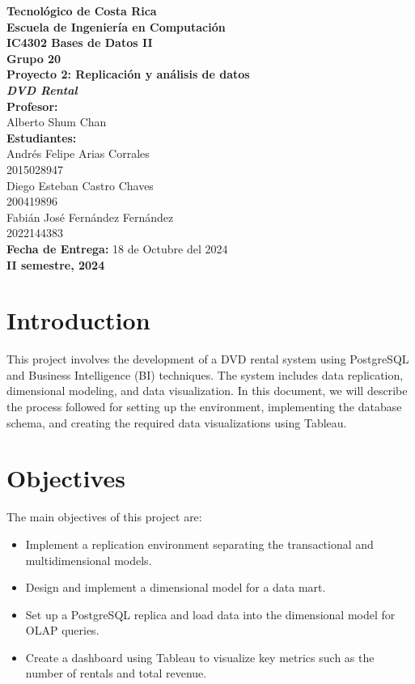 \documentclass[a4paper, 12pt]{article}
\begin{document}
\begin{titlepage}
    \centering
    {\Large\textbf{Tecnológico de Costa Rica}}\\[0.5cm]
    {\Large\textbf{Escuela de Ingeniería en Computación}}\\[0.5cm]
    {\Large\textbf{IC4302 Bases de Datos II}}\\[0.5cm]
    {\Large\textbf{Grupo 20}}\\[2cm]

    {\Large\bfseries Proyecto 2: Replicación y análisis de datos}\\[0.5cm]
    {\Large\bfseries \emph{DVD Rental}}\\[2cm]

    \textbf{\large Profesor:}\\
    \large Alberto Shum Chan \\[1.5cm]

    \textbf{\large Estudiantes:}\\[0.5cm]
    \large Andrés Felipe Arias Corrales\\
    2015028947\\[0.5cm]
    \large Diego Esteban Castro Chaves\\
    200419896\\[0.5cm]
    \large Fabián José Fernández Fernández\\
    2022144383\\[2cm]

    \textbf{\large Fecha de Entrega:} 18 de Octubre del 2024\\[0.5cm]
    \textbf{\large II semestre, 2024}
\end{titlepage}

\tableofcontents
\newpage

\section{Introduction}
This project involves the development of a DVD rental system using PostgreSQL and Business Intelligence (BI) techniques. The system includes data replication, dimensional modeling, and data visualization. In this document, we will describe the process followed for setting up the environment, implementing the database schema, and creating the required data visualizations using Tableau.

\section{Objectives}
The main objectives of this project are:
\begin{itemize}
    \item Implement a replication environment separating the transactional and multidimensional models.
    \item Design and implement a dimensional model for a data mart.
    \item Set up a PostgreSQL replica and load data into the dimensional model for OLAP queries.
    \item Create a dashboard using Tableau to visualize key metrics such as the number of rentals and total revenue.
\end{itemize}
\end{document}
